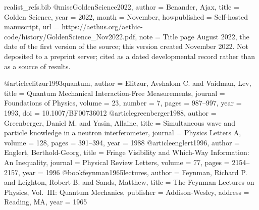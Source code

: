 \begin{filecontents}{realist_refs.bib}
@misc{GoldenScience2022,
  author       = {Benander, Ajax},
  title        = {Golden Science},
  year         = {2022},
  month        = {November},
  howpublished = {Self-hosted manuscript},
  url          = {https://aethus.org/aethic-code/history/GoldenScience_Nov2022.pdf},
  note         = {Title page August 2022, the date of the first version of the source; this version created November 2022. Not deposited to a
                  preprint server; cited as a dated developmental record rather than
                  as a source of results.}
}

@article{elitzur1993quantum,
  author  = {Elitzur, Avshalom C. and Vaidman, Lev},
  title   = {Quantum Mechanical Interaction-Free Measurements},
  journal = {Foundations of Physics},
  volume  = {23},
  number  = {7},
  pages   = {987--997},
  year    = {1993},
  doi     = {10.1007/BF00736012}
}
@article{greenberger1988,
  author = {Greenberger, Daniel M. and Yasin, Allaine},
  title = {Simultaneous wave and particle knowledge in a neutron interferometer},
  journal = {Physics Letters A},
  volume = {128}, pages = {391--394}, year = {1988}
}
@article{englert1996,
  author = {Englert, Berthold-Georg},
  title = {Fringe Visibility and Which-Way Information: An Inequality},
  journal = {Physical Review Letters},
  volume = {77}, pages = {2154--2157}, year = {1996}
}
@book{feynman1965lectures,
  author = {Feynman, Richard P. and Leighton, Robert B. and Sands, Matthew},
  title = {The Feynman Lectures on Physics, Vol.~III: Quantum Mechanics},
  publisher = {Addison-Wesley},
  address = {Reading, MA},
  year = {1965}
}
\end{filecontents}

\documentclass[11pt]{article}
\usepackage[margin=1in]{geometry}
\usepackage{amsmath, amssymb, amsthm}
\usepackage[hidelinks]{hyperref}
\usepackage{microtype}
\usepackage{booktabs}
\usepackage[style=numeric, sorting=none]{biblatex}



\newtheorem{theorem}{Theorem}
\newtheorem{lemma}{Lemma}
\newtheorem{corollary}{Corollary}
\newtheorem{definition}{Definition}
\newtheorem{proposition}{Proposition}

